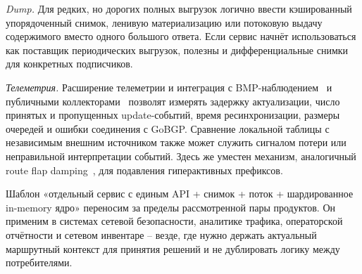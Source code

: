 \textit{Dump.} Для редких, но дорогих полных выгрузок логично ввести
кэшированный упорядоченный снимок, ленивую материализацию или
потоковую выдачу содержимого вместо одного большого ответа. Если
сервис начнёт использоваться как поставщик периодических выгрузок,
полезны и дифференциальные снимки для конкретных подписчиков.

\textit{Телеметрия.} Расширение телеметрии и интеграция с
BMP-наблюдением~\cite{rfc7854} и публичными
коллекторами~\cite{ripe-ris,routeviews} позволят измерять задержку
актуализации, число принятых и пропущенных update-событий, время
ресинхронизации, размеры очередей и ошибки соединения с GoBGP. Сравнение
локальной таблицы с независимым внешним источником также может служить
сигналом потери или неправильной интерпретации событий. Здесь же уместен
механизм, аналогичный route flap damping~\cite{rfc2439}, для подавления
гиперактивных префиксов.

Шаблон «отдельный сервис с единым API + снимок + поток + шардированное
in-memory ядро» переносим за пределы рассмотренной пары продуктов. Он
применим в системах сетевой безопасности, аналитике трафика,
операторской отчётности и сетевом инвентаре -- везде, где нужно держать
актуальный маршрутный контекст для принятия решений и не дублировать
логику между потребителями.

